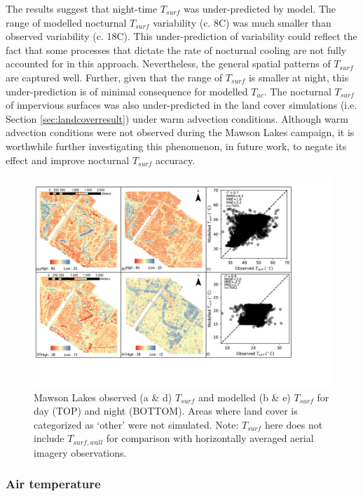 \documentclass[journal abbreviation, manuscript]{copernicus}
\begin{document}
The results suggest that night-time $T_{surf}$ was under-predicted by model. The range of modelled nocturnal $T_{surf}$ variability (c. 8\degree C) was much smaller than observed variability (c. 18\degree C). This under-prediction of variability could reflect the fact that some processes that dictate the rate of nocturnal cooling are not fully accounted for in this approach. Nevertheless, the general spatial patterns of $T_{surf}$ are captured well. Further, given that the  range of $T_{surf}$ is smaller at night, this under-prediction is of minimal consequence for modelled $T_{ac}$. The nocturnal $T_{surf}$ of impervious surfaces was also under-predicted in the land cover simulations (i.e. Section \ref{sec:landcoverresult}) under warm advection conditions. Although warm advection conditions were not observed during the Mawson Lakes campaign, it is worthwhile further investigating this phenomenon, in future work, to negate its effect and improve nocturnal $T_{surf}$ accuracy. 


\begin{figure}
\includegraphics[width=1\textwidth]{figure5.png}
 \caption{Mawson Lakes  observed (a \& d) $T_{surf}$ and modelled (b \& e) $T_{surf}$ for day (TOP) and night (BOTTOM). Areas where land cover is categorized as `other' were not simulated. Note: $T_{surf}$ here does not include $T_{surf,wall}$ for comparison with horizontally averaged aerial imagery observations.} \label{fig:MawsonBase}
\end{figure}

 


\subsubsection*{Air temperature}\label{sec:airtempresult} 
\end{document}
